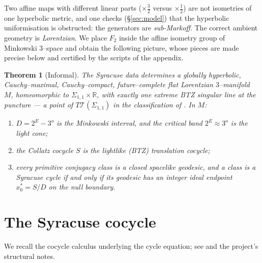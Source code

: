 \documentclass[11pt,a4paper]{article}
\theoremstyle{bourbaki}
\newtheorem{thm}{Theorem}[section]
\theoremstyle{bourbakidef}
\newcommand{\R}{\mathbb{R}}
\newcommand{\Teich}{\mathcal{T}}
\begin{document}
Two affine maps with different linear parts ($\times\tfrac32$ versus $\times\tfrac12$) are
not isometries of one hyperbolic metric, and one checks (\S\ref{sec:model}) that the
hyperbolic uniformisation is obstructed: the generators are \emph{sub-Markoff}. The correct
ambient geometry is \emph{Lorentzian}. We place $F_2$ inside the affine isometry group of
Minkowski $3$--space and obtain the following picture, whose pieces are made precise below
and certified by the scripts of the appendix.

\begin{thm}[Informal]\label{thm:informal}
The Syracuse data determines a globally hyperbolic, Cauchy--maximal, Cauchy--compact,
future--complete flat Lorentzian $3$--manifold $M$, homeomorphic to $\Sigma_{1,1}\times\R$,
with exactly one extreme BTZ singular line at the puncture --- a point of
$T\Teich(\Sigma_{1,1})$ in the classification of \cite{Brunswic2021}. In $M$:
\begin{enumerate}
\item $D=2^E-3^o$ is the Minkowski interval, and the critical band $2^E\approx 3^o$ is the
      light cone;
\item the Collatz cocycle $S$ is the lightlike (BTZ) translation cocycle;
\item every primitive conjugacy class is a closed spacelike geodesic, and a class is a
      \emph{Syracuse cycle} if and only if its geodesic has an integer ideal endpoint
      $x_0^\ast=S/D$ on the null boundary.
\end{enumerate}
\end{thm}

\section{The Syracuse cocycle}\label{sec:cocycle}

We recall the cocycle calculus underlying the cycle equation; see
\cite{BohmSontacchi,Brunswic2021} and the project's structural notes.
\end{document}

